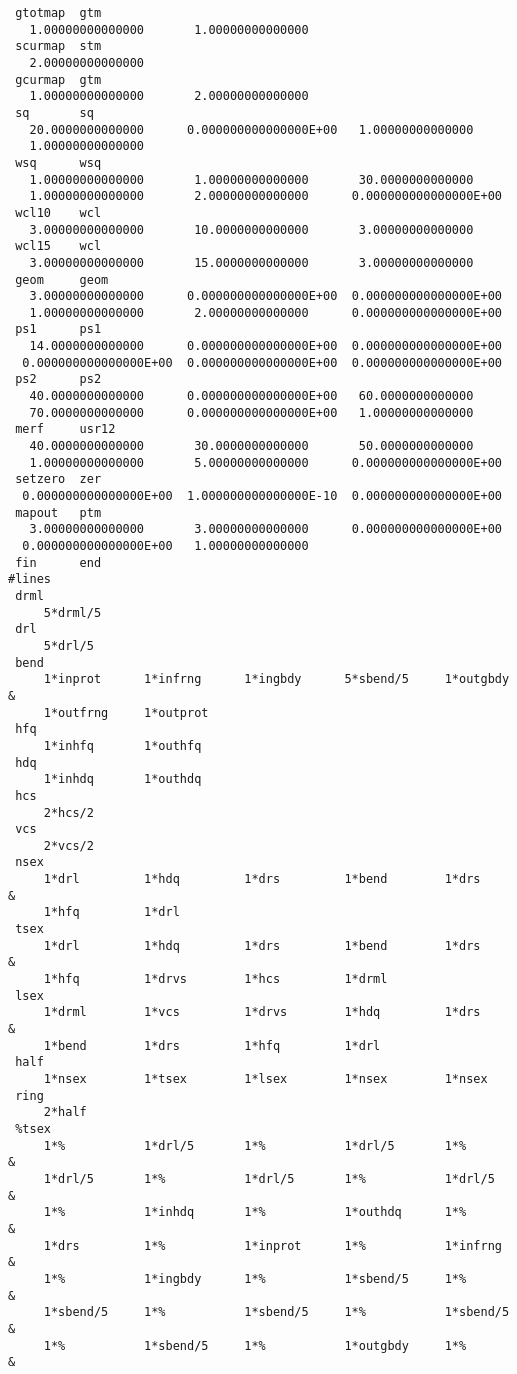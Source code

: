 \begin{footnotesize}
\begin{verbatim}
 gtotmap  gtm
   1.00000000000000       1.00000000000000
 scurmap  stm
   2.00000000000000
 gcurmap  gtm
   1.00000000000000       2.00000000000000
 sq       sq
   20.0000000000000      0.000000000000000E+00   1.00000000000000
   1.00000000000000
 wsq      wsq
   1.00000000000000       1.00000000000000       30.0000000000000
   1.00000000000000       2.00000000000000      0.000000000000000E+00
 wcl10    wcl
   3.00000000000000       10.0000000000000       3.00000000000000
 wcl15    wcl
   3.00000000000000       15.0000000000000       3.00000000000000
 geom     geom
   3.00000000000000      0.000000000000000E+00  0.000000000000000E+00
   1.00000000000000       2.00000000000000      0.000000000000000E+00
 ps1      ps1
   14.0000000000000      0.000000000000000E+00  0.000000000000000E+00
  0.000000000000000E+00  0.000000000000000E+00  0.000000000000000E+00
 ps2      ps2
   40.0000000000000      0.000000000000000E+00   60.0000000000000
   70.0000000000000      0.000000000000000E+00   1.00000000000000
 merf     usr12
   40.0000000000000       30.0000000000000       50.0000000000000
   1.00000000000000       5.00000000000000      0.000000000000000E+00
 setzero  zer
  0.000000000000000E+00  1.000000000000000E-10  0.000000000000000E+00
 mapout   ptm
   3.00000000000000       3.00000000000000      0.000000000000000E+00
  0.000000000000000E+00   1.00000000000000
 fin      end
#lines
 drml
     5*drml/5
 drl
     5*drl/5
 bend
     1*inprot      1*infrng      1*ingbdy      5*sbend/5     1*outgbdy  &
     1*outfrng     1*outprot
 hfq
     1*inhfq       1*outhfq
 hdq
     1*inhdq       1*outhdq
 hcs
     2*hcs/2
 vcs
     2*vcs/2
 nsex
     1*drl         1*hdq         1*drs         1*bend        1*drs      &
     1*hfq         1*drl
 tsex
     1*drl         1*hdq         1*drs         1*bend        1*drs      &
     1*hfq         1*drvs        1*hcs         1*drml
 lsex
     1*drml        1*vcs         1*drvs        1*hdq         1*drs      &
     1*bend        1*drs         1*hfq         1*drl
 half
     1*nsex        1*tsex        1*lsex        1*nsex        1*nsex
 ring
     2*half
 %tsex
     1*%           1*drl/5       1*%           1*drl/5       1*%        &
     1*drl/5       1*%           1*drl/5       1*%           1*drl/5    &
     1*%           1*inhdq       1*%           1*outhdq      1*%        &
     1*drs         1*%           1*inprot      1*%           1*infrng   &
     1*%           1*ingbdy      1*%           1*sbend/5     1*%        &
     1*sbend/5     1*%           1*sbend/5     1*%           1*sbend/5  &
     1*%           1*sbend/5     1*%           1*outgbdy     1*%        &

\end{verbatim}
\end{footnotesize}
